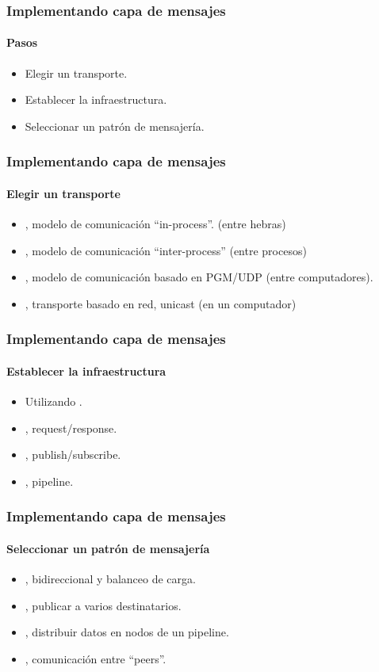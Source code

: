 \begin{frame}
    \frametitle{Implementando capa de mensajes}
    \framesubtitle{Pasos}
    \begin{itemize}
        \item Elegir un transporte.
        \item Establecer la infraestructura.
        \item Seleccionar un patrón de mensajería.
    \end{itemize}
\end{frame}

\begin{frame}
    \frametitle{Implementando capa de mensajes}
    \framesubtitle{Elegir un transporte}
    \begin{itemize}
        \item {}, modelo de comunicación ``in-process''. (entre hebras)
        \item {}, modelo de comunicación ``inter-process'' (entre procesos)
        \item {}, modelo de comunicación basado en PGM/UDP (entre computadores).
        \item {}, transporte basado en red, unicast (en un computador)
    \end{itemize}
\end{frame}

\begin{frame}
    \frametitle{Implementando capa de mensajes}
    \framesubtitle{Establecer la infraestructura}
    \begin{itemize}
        \item Utilizando .
        \item {}, request/response.
        \item {}, publish/subscribe.
        \item {}, pipeline.
    \end{itemize}
\end{frame}

\begin{frame}
    \frametitle{Implementando capa de mensajes}
    \framesubtitle{Seleccionar un patrón de mensajería}
    \begin{itemize}
        \item {}, bidireccional y balanceo de carga.
        \item {}, publicar a varios destinatarios.
        \item {}, distribuir datos en nodos de un pipeline.
        \item {}, comunicación entre ``peers''.
    \end{itemize}
\end{frame}
